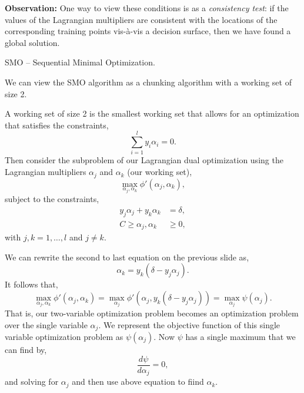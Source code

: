 \documentclass[a4paper,blends,pdf,colorBG,slideColor]{prosper}
\begin{document}
{\bf Observation:} One way to view these conditions is as a {\em consistency test}: if the values of the Lagrangian multipliers
are consistent with the locations of the corresponding training points vis-\`{a}-vis a decision surface,
then we have found a global solution.

\es


SMO -- Sequential Minimal Optimization.

We can view the SMO algorithm as a chunking algorithm with a working set of size 2.

A working set of size 2 is the smallest working set that allows for an optimization that
satisfies the constraints,
\begin{equation*}
\sum_{i=1}^l y_i \alpha_i = 0.
\end{equation*}
Then consider the  subproblem of our Lagrangian dual optimization using the Lagrangian multipliers $\alpha_j$
and $\alpha_k$ (our working set),
\begin{equation*}
\max_{\alpha_j,\alpha_k} \phi'(\alpha_j,\alpha_k),
\end{equation*}
subject to the constraints,
\begin{align*}
y_j \alpha_j + y_k \alpha_k &= \delta,\\
C \ge \alpha_j,\alpha_k &\ge 0,  
\end{align*}
with $j,k = 1, \ldots, l$ and $j\ne k$.

\es


We can rewrite the second to last equation on the previous slide as,
\begin{equation*}
\alpha_k = y_k (\delta - y_j \alpha_j).
\end{equation*}
It follows that,
\begin{equation*}
\max_{\alpha_j,\alpha_k} \phi'(\alpha_j,\alpha_k) = \max_{\alpha_j} \phi' \left (\alpha_j,y_k(\delta - y_j\alpha_j)\right) = \max_{\alpha_j} \psi(\alpha_j).
\end{equation*}
That is, our two-variable optimization problem becomes an optimization problem over the single variable  $\alpha_j$.  We represent the objective function of this single variable optimization problem
as $\psi(\alpha_j)$.
Now $\psi$ has a single maximum that we can find by,
\begin{equation*}
\frac{d \psi}{d \alpha_j} = 0,
\end{equation*} 
and solving for $\alpha_j$ and then use above
equation to fiind $\alpha_k$.
\end{document}
